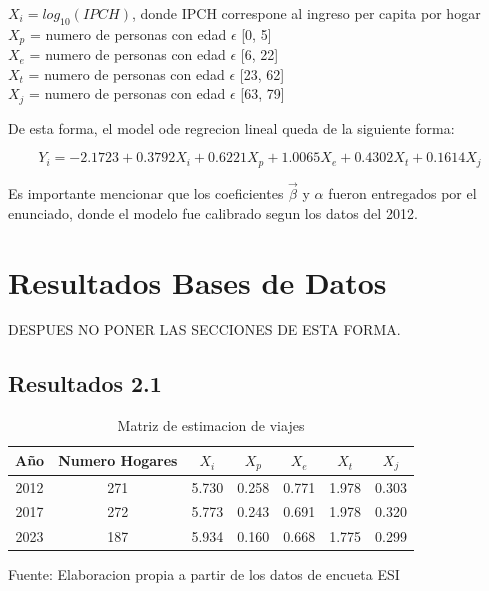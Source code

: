 \documentclass[12pt]{article} %
\begin{document}
\begin{center}
    $X_i = log_{10}(IPCH)$, donde IPCH correspone al ingreso per capita por hogar\\
    $X_p$ = numero de personas con edad $\epsilon$ [0, 5]\\
    $X_e$ = numero de personas con edad $\epsilon$ [6, 22]\\
    $X_t$ = numero de personas con edad $\epsilon$ [23, 62]\\
    $X_j$ = numero de personas con edad $\epsilon$ [63, 79]\\
\end{center}

De esta forma, el model ode regrecion lineal queda de la siguiente forma:

\begin{equation}
    Y_i = -2.1723 + 0.3792X_i + 0.6221X_p + 1.0065X_e + 0.4302X_t + 0.1614X_j
\end{equation}

Es importante mencionar que los coeficientes $\vec{\beta}$ y $\alpha$ fueron entregados por el enunciado, donde el modelo fue calibrado segun los datos del 2012.

\section{Resultados Bases de Datos}
DESPUES NO PONER LAS SECCIONES DE ESTA FORMA.

\subsection{Resultados 2.1}

\begin{table}[H]
    \centering
    \begin{tabular}{|c|c|c|c|c|c|c|}
        \hline
        Año & Numero Hogares & $X_i$ & $X_p$ & $X_e$ & $X_t$ & $X_j$ \\
        \hline
        2012 & 271 &5.730 & 0.258 & 0.771 & 1.978 & 0.303 \\
        2017 & 272 &5.773 & 0.243 & 0.691 & 1.978 & 0.320 \\
        2023 & 187 &5.934 & 0.160 & 0.668 & 1.775 & 0.299 \\
        \hline
    \end{tabular}
    \caption{Matriz de estimacion de viajes}
    Fuente: Elaboracion propia a partir de los datos de encueta ESI
\end{table}
\end{document}
